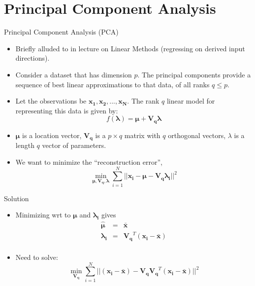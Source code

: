 \documentclass[aspectratio=169]{beamer}
\let \vec \mathbf
\begin{document}
\section{Principal Component Analysis}


\begin{frame}{Principal Component Analysis (PCA)}
    \begin{itemize}
        \item Briefly alluded to in lecture on Linear Methods (regressing on derived input directions).
        \item Consider a dataset that has dimension $p$. The principal components provide a sequence of best linear approximations to that data, of all ranks $q \leq p$.
        \item Let the observations be $\vec{x_1}, \vec{x_2}, ..., \vec{x_N}$. The rank $q$ linear model for representing this data is given by:
        \begin{equation*}
            f(\vec{\lambda}) = \vec{\mu} + \vec{V_q}\vec{\lambda}
        \end{equation*}
        \item $\vec{\mu}$ is a location vector, $\vec{V_q}$ is a $p \times q$ matrix with $q$ orthogonal vectors, $\lambda$ is a length $q$ vector of parameters.
        \item We want to minimize the ``reconstruction error'',
        \begin{equation*}
            \min_{\vec{\mu}, \vec{V_q}, \vec{\lambda}} \sum_{i=1}^N ||\vec{x_i} - \vec{\mu} - \vec{V_q}\vec{\lambda_i}||^2
        \end{equation*}
    \end{itemize}
\end{frame}

\begin{frame}{Solution}
    \begin{itemize}
        \item Minimizing wrt to $\vec{\mu}$ and $\vec{\lambda_i}$ gives
        \begin{eqnarray*}
        \hat{\vec{\mu}} & = & \bar{\vec{x}}\\
        \vec{\lambda_i} & = & \vec{V_q}^T(\vec{x_i}-\bar{\vec{x}})\\
    \end{eqnarray*}
        \item Need to solve:
        \begin{equation*}
          \min_{\vec{V_q}} \sum_{i=1}^N ||(\vec{x_i}-\bar{\vec{x}}) - \vec{V_q}\vec{V_q}^T(\vec{x_i}-\bar{\vec{x}})||^2
        \end{equation*}
    \end{itemize}
\end{frame}
\end{document}
